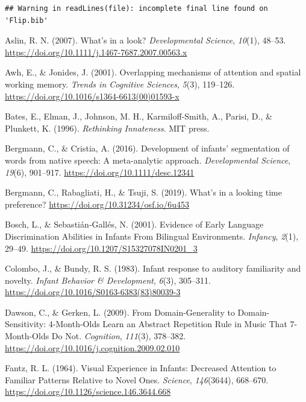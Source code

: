 \documentclass[english,man]{apa6}
\begin{document}
\begin{verbatim}
## Warning in readLines(file): incomplete final line found on 'Flip.bib'
\end{verbatim}

\begingroup
\setlength{\parindent}{-0.5in}
\setlength{\leftskip}{0.5in}

\hypertarget{refs}{}
\leavevmode\hypertarget{ref-aslin2007}{}%
Aslin, R. N. (2007). What's in a look? \emph{Developmental Science}, \emph{10}(1), 48--53. \url{https://doi.org/10.1111/j.1467-7687.2007.00563.x}

\leavevmode\hypertarget{ref-awh2001}{}%
Awh, E., \& Jonides, J. (2001). Overlapping mechanisms of attention and spatial working memory. \emph{Trends in Cognitive Sciences}, \emph{5}(3), 119--126. \url{https://doi.org/10.1016/s1364-6613(00)01593-x}

\leavevmode\hypertarget{ref-bates1996}{}%
Bates, E., Elman, J., Johnson, M. H., Karmiloff-Smith, A., Parisi, D., \& Plunkett, K. (1996). \emph{Rethinking Innateness}. MIT press.

\leavevmode\hypertarget{ref-bergmann2016}{}%
Bergmann, C., \& Cristia, A. (2016). Development of infants' segmentation of words from native speech: A meta-analytic approach. \emph{Developmental Science}, \emph{19}(6), 901--917. \url{https://doi.org/10.1111/desc.12341}

\leavevmode\hypertarget{ref-bergmann_rabagliati_tsuji_2019}{}%
Bergmann, C., Rabagliati, H., \& Tsuji, S. (2019). What's in a looking time preference? \url{https://doi.org/10.31234/osf.io/6u453}

\leavevmode\hypertarget{ref-bosch2001}{}%
Bosch, L., \& Sebastián‐Gallés, N. (2001). Evidence of Early Language Discrimination Abilities in Infants From Bilingual Environments. \emph{Infancy}, \emph{2}(1), 29--49. \url{https://doi.org/10.1207/S15327078IN0201_3}

\leavevmode\hypertarget{ref-colombo1983}{}%
Colombo, J., \& Bundy, R. S. (1983). Infant response to auditory familiarity and novelty. \emph{Infant Behavior \& Development}, \emph{6}(3), 305--311. \url{https://doi.org/10.1016/S0163-6383(83)80039-3}

\leavevmode\hypertarget{ref-dawson2009}{}%
Dawson, C., \& Gerken, L. (2009). From Domain-Generality to Domain-Sensitivity: 4-Month-Olds Learn an Abstract Repetition Rule in Music That 7-Month-Olds Do Not. \emph{Cognition}, \emph{111}(3), 378--382. \url{https://doi.org/10.1016/j.cognition.2009.02.010}

\leavevmode\hypertarget{ref-fantz1964}{}%
Fantz, R. L. (1964). Visual Experience in Infants: Decreased Attention to Familiar Patterns Relative to Novel Ones. \emph{Science}, \emph{146}(3644), 668--670. \url{https://doi.org/10.1126/science.146.3644.668}
\end{document}
